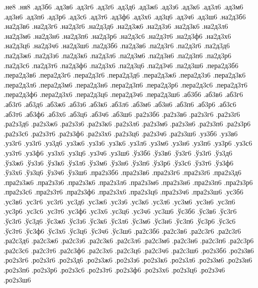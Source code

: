 {%
.не8
.ня8
%
%
%
.ад3б6
.ад3в6
.ад3г6
.ад3ґ6
.ад3д6
.ад3ж6
.ад3з6
.ад3к6
.ад3л6
.ад3м6
.ад3н6
.ад3п6
.ад3р6
.ад3с6
.ад3т6
.ад3ф6
.ад3х6
.ад3ц6
.ад3ч6
.ад3ш6
.на2д3б6
.на2д3в6
.на2д3г6
.на2д3ґ6
.на2д3д6
.на2д3ж6
.на2д3з6
.на2д3к6
.на2д3л6
.на2д3м6
.на2д3н6
.на2д3п6
.на2д3р6
.на2д3с6
.на2д3т6
.на2д3ф6
.на2д3х6
.на2д3ц6
.на2д3ч6
.на2д3ш6
.па2д3б6
.па2д3в6
.па2д3г6
.па2д3ґ6
.па2д3д6
.па2д3ж6
.па2д3з6
.па2д3к6
.па2д3л6
.па2д3м6
.па2д3н6
.па2д3п6
.па2д3р6
.па2д3с6
.па2д3т6
.па2д3ф6
.па2д3х6
.па2д3ц6
.па2д3ч6
.па2д3ш6
.пера2д3б6
.пера2д3в6
.пера2д3г6
.пера2д3ґ6
.пера2д3д6
.пера2д3ж6
.пера2д3з6
.пера2д3к6
.пера2д3л6
.пера2д3м6
.пера2д3н6
.пера2д3п6
.пера2д3р6
.пера2д3с6
.пера2д3т6
.пера2д3ф6
.пера2д3х6
.пера2д3ц6
.пера2д3ч6
.пера2д3ш6
.аб3б6
.аб3в6
.аб3г6
.аб3ґ6
.аб3д6
.аб3ж6
.аб3з6
.аб3к6
.аб3л6
.аб3м6
.аб3н6
.аб3п6
.аб3р6
.аб3с6
.аб3т6
.аб3ф6
.аб3х6
.аб3ц6
.аб3ч6
.аб3ш6
.ра2з3б6
.ра2з3в6
.ра2з3г6
.ра2з3ґ6
.ра2з3д6
.ра2з3ж6
.ра2з3з6
.ра2з3к6
.ра2з3л6
.ра2з3м6
.ра2з3н6
.ра2з3п6
.ра2з3р6
.ра2з3с6
.ра2з3т6
.ра2з3ф6
.ра2з3х6
.ра2з3ц6
.ра2з3ч6
.ра2з3ш6
.уз3б6
.уз3в6
.уз3г6
.уз3ґ6
.уз3д6
.уз3ж6
.уз3з6
.уз3к6
.уз3л6
.уз3м6
.уз3н6
.уз3п6
.уз3р6
.уз3с6
.уз3т6
.уз3ф6
.уз3х6
.уз3ц6
.уз3ч6
.уз3ш6
.ўз3б6
.ўз3в6
.ўз3г6
.ўз3ґ6
.ўз3д6
.ўз3ж6
.ўз3з6
.ўз3к6
.ўз3л6
.ўз3м6
.ўз3н6
.ўз3п6
.ўз3р6
.ўз3с6
.ўз3т6
.ўз3ф6
.ўз3х6
.ўз3ц6
.ўз3ч6
.ўз3ш6
.пра2з3б6
.пра2з3в6
.пра2з3г6
.пра2з3ґ6
.пра2з3д6
.пра2з3ж6
.пра2з3з6
.пра2з3к6
.пра2з3л6
.пра2з3м6
.пра2з3н6
.пра2з3п6
.пра2з3р6
.пра2з3с6
.пра2з3т6
.пра2з3ф6
.пра2з3х6
.пра2з3ц6
.пра2з3ч6
.пра2з3ш6
.ус3б6
.ус3в6
.ус3г6
.ус3ґ6
.ус3д6
.ус3ж6
.ус3з6
.ус3к6
.ус3л6
.ус3м6
.ус3н6
.ус3п6
.ус3р6
.ус3с6
.ус3т6
.ус3ф6
.ус3х6
.ус3ц6
.ус3ч6
.ус3ш6
.ўс3б6
.ўс3в6
.ўс3г6
.ўс3ґ6
.ўс3д6
.ўс3ж6
.ўс3з6
.ўс3к6
.ўс3л6
.ўс3м6
.ўс3н6
.ўс3п6
.ўс3р6
.ўс3с6
.ўс3т6
.ўс3ф6
.ўс3х6
.ўс3ц6
.ўс3ч6
.ўс3ш6
.ра2с3б6
.ра2с3в6
.ра2с3г6
.ра2с3ґ6
.ра2с3д6
.ра2с3ж6
.ра2с3з6
.ра2с3к6
.ра2с3л6
.ра2с3м6
.ра2с3н6
.ра2с3п6
.ра2с3р6
.ра2с3с6
.ра2с3т6
.ра2с3ф6
.ра2с3х6
.ра2с3ц6
.ра2с3ч6
.ра2с3ш6
.ро2з3б6
.ро2з3в6
.ро2з3г6
.ро2з3ґ6
.ро2з3д6
.ро2з3ж6
.ро2з3з6
.ро2з3к6
.ро2з3л6
.ро2з3м6
.ро2з3н6
.ро2з3п6
.ро2з3р6
.ро2з3с6
.ро2з3т6
.ро2з3ф6
.ро2з3х6
.ро2з3ц6
.ро2з3ч6
.ро2з3ш6
}

